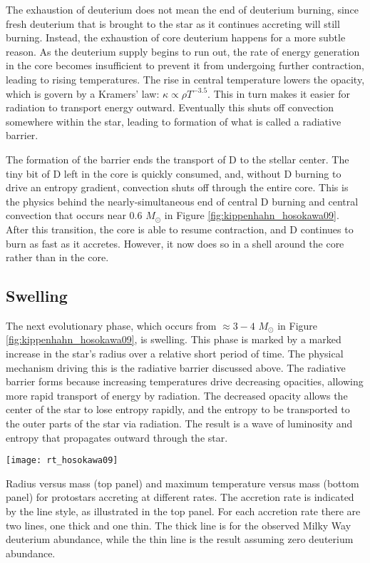 The exhaustion of deuterium does not mean the end of deuterium burning, since fresh deuterium that is brought to the star as it continues accreting will still burning. Instead, the exhaustion of core deuterium happens for a more subtle reason. As the deuterium supply begins to run out, the rate of energy generation in the core becomes insufficient to prevent it from undergoing further contraction, leading to rising temperatures. The rise in central temperature lowers the opacity, which is govern by a Kramers' law: $\kappa \propto \rho T^{-3.5}$. This in turn makes it easier for radiation to transport energy outward. Eventually this shuts off convection somewhere within the star, leading to formation of what is called a radiative barrier.

The formation of the barrier ends the transport of D to the stellar center. The tiny bit of D left in the core is quickly consumed, and, without D burning to drive an entropy gradient, convection shuts off through the entire core. This is the physics behind the nearly-simultaneous end of central D burning and central convection that occurs near $0.6$ $M_\odot$ in Figure \ref{fig:kippenhahn_hosokawa09}. After this transition, the core is able to resume contraction, and D continues to burn as fast as it accretes. However, it now does so in a shell around the core rather than in the core.

\subsection{Swelling}

The next evolutionary phase, which occurs from $\approx 3-4$ $M_\odot$ in Figure \ref{fig:kippenhahn_hosokawa09}, is swelling. This phase is marked by a marked increase in the star's radius over a relative short period of time. The physical mechanism driving this is the radiative barrier discussed above. The radiative barrier forms because increasing temperatures drive decreasing opacities, allowing more rapid transport of energy by radiation. The decreased opacity allows the center of the star to lose entropy rapidly, and the entropy to be transported to the outer parts of the star via radiation. The result is a wave of luminosity and entropy that propagates outward through the star.

\begin{marginfigure}
\texttt{[image: rt\_hosokawa09]}
\caption[Protostellar mass-radius relation for different accretion rates]{
\label{fig:rt_hosokawa09}
Radius versus mass (top panel) and maximum temperature versus mass (bottom panel) for protostars accreting at different rates. The accretion rate is indicated by the line style, as illustrated in the top panel. For each accretion rate there are two lines, one thick and one thin. The thick line is for the observed Milky Way deuterium abundance, while the thin line is the result assuming zero deuterium abundance.
}
\end{marginfigure}

